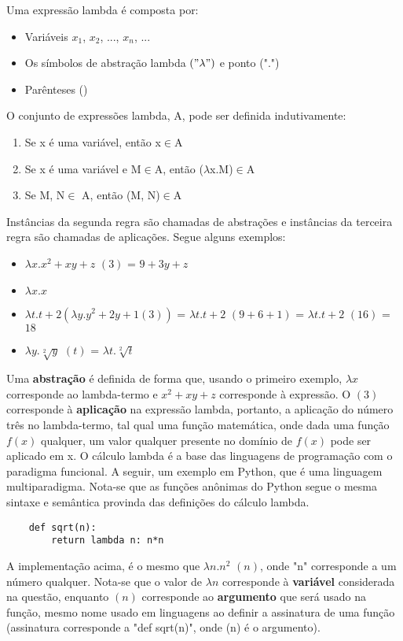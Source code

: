 \documentclass{article}
\begin{document}
Uma expressão lambda é composta por:
\begin{itemize}
    \item Variáveis $x_{1}$, $x_{2}$, ..., $x_{n}$, ...
    \item Os símbolos de abstração lambda $("\lambda")$ e ponto (".")
    \item Parênteses ()
\end{itemize}
O conjunto de expressões lambda, A, pode ser definida indutivamente:
\begin{enumerate}
    \item Se x é uma variável, então x$\in$A
    \item Se x é uma variável e M$\in$A, então ($\lambda$x.M)$\in$A
    \item Se M, N$\in$ A, então (M, N)$\in$A
\end{enumerate}
Instâncias da segunda regra são chamadas de abstrações e instâncias da terceira
regra são chamadas de aplicações. Segue alguns exemplos:
\begin{itemize}
    \item $\lambda x.x^{2}+xy+z$ $(3)$ = $9+3y+z$
    \item $\lambda x.x$
    \item $\lambda t.t + 2(\lambda y.y^{2} + 2y + 1 (3))$ = $\lambda t.t + 2$
        $(9+6+1)$  = $\lambda t.t + 2$ $(16)$ = $18$
    \item $\lambda y.\sqrt[2]{y}$ $(t)$ = $\lambda t.\sqrt[2]{t}$
\end{itemize}
Uma \textbf{abstração} é definida de forma que, usando o primeiro exemplo,
$\lambda x$ corresponde ao lambda-termo e $x^{2}+xy+z$ corresponde à expressão.
O $(3)$ corresponde à \textbf{aplicação} na expressão lambda, portanto, a
aplicação do número três no lambda-termo, tal qual uma função matemática, onde
dada uma função $f(x)$ qualquer, um valor qualquer presente no domínio de
$f(x)$ pode ser aplicado em x. O cálculo lambda é a base das linguagens de
programação com o paradigma funcional. A seguir, um exemplo em Python, que é
uma linguagem multiparadigma. Nota-se que as funções anônimas do Python segue o
mesma sintaxe e semântica provinda das definições do cálculo lambda.
    \begin{lstlisting}
    def sqrt(n):
        return lambda n: n*n
    \end{lstlisting}
A implementação acima, é o mesmo que $\lambda n. n^{2}$ $(n)$, onde "n"
corresponde a um número qualquer. Nota-se que o valor de $\lambda n$
corresponde à \textbf{variável} considerada na questão, enquanto $(n)$
corresponde ao \textbf{argumento} que será usado na função, mesmo nome usado em
linguagens ao definir a assinatura de uma função (assinatura corresponde a "def
sqrt(n)", onde (n) é o argumento).
\end{document}
